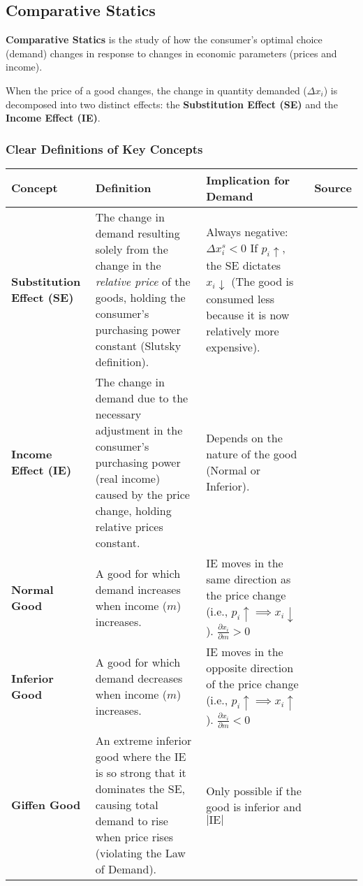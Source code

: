 \documentclass{article}
\begin{document}
\vspace{1em}

\subsection{Comparative Statics}

\textbf{Comparative Statics} is the study of how the consumer's optimal choice (demand) changes in response to changes in economic parameters (prices and income).

When the price of a good changes, the change in quantity demanded ($\Delta x_i$) is decomposed into two distinct effects: the \textbf{Substitution Effect (SE)} and the \textbf{Income Effect (IE)}.

\subsubsection*{Clear Definitions of Key Concepts}

\begin{tabular*}{\textwidth}{@{\extracolsep{\fill}} l p{} p{} l}
\toprule
\textbf{Concept} & \textbf{Definition} & \textbf{Implication for Demand} & \textbf{Source} \\
\midrule
\textbf{Substitution Effect (SE)} & The change in demand resulting solely from the change in the \textit{relative price} of the goods, holding the consumer's purchasing power constant (Slutsky definition). & Always negative: $\Delta x_i^s < 0$ If $p_i \uparrow$, the SE dictates $x_i \downarrow$ (The good is consumed less because it is now relatively more expensive). & \\
\addlinespace
\textbf{Income Effect (IE)} & The change in demand due to the necessary adjustment in the consumer's purchasing power (real income) caused by the price change, holding relative prices constant. & Depends on the nature of the good (Normal or Inferior). & \\
\addlinespace
\textbf{Normal Good} & A good for which demand increases when income ($m$) increases. & IE moves in the same direction as the price change (i.e., $p_i \uparrow \implies x_i \downarrow$). $\frac{\partial x_i}{\partial m} > 0$ & \\
\addlinespace
\textbf{Inferior Good} & A good for which demand decreases when income ($m$) increases. & IE moves in the opposite direction of the price change (i.e., $p_i \uparrow \implies x_i \uparrow$). $\frac{\partial x_i}{\partial m} < 0$ & \\
\addlinespace
\textbf{Giffen Good} & An extreme inferior good where the IE is so strong that it dominates the SE, causing total demand to rise when price rises (violating the Law of Demand). & Only possible if the good is inferior and $| \text{IE}|$ & \\
\bottomrule
\end{tabular*}
\end{document}
